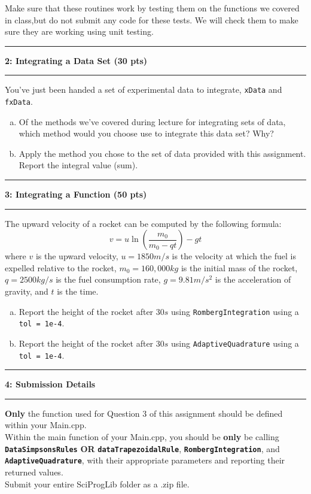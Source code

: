 \documentclass[11pt]{article}
\newcommand\question[2]{\vspace{.25in}\hrule\textbf{#1: #2}\vspace{.5em}\hrule\vspace{.10in}}
\begin{document}
Make sure that these routines work by testing them on the functions we covered in class,but do not submit any code for these tests. We will check them to make sure they are working using unit testing.
\newpage
\question{2}{Integrating a Data Set (30 pts)}
You've just been handed a set of experimental data to integrate, \texttt{xData} and \texttt{fxData}. 
\begin{enumerate}[(a)]
	\item Of the methods we've covered during lecture for integrating sets of data, which method would you choose use to integrate this data set? Why? \vspace{2cm}
	\item Apply the method you chose to the set of data provided with this assignment. Report the integral value (sum).
\end{enumerate}

\vspace{0.5cm}

\question{3}{Integrating a Function (50 pts)}
The upward velocity of a rocket can be computed by
the following formula:
$$v = u\ln\left(\frac{m_0}{m_0-qt}\right) -gt$$
where $v$ is the upward velocity, $u =1850 m/s$ is the velocity at which the fuel is expelled relative to the rocket, $m_0 = 160,000 kg$ is the initial mass of the rocket, $q = 2500 kg/s$ is the fuel consumption rate, $g = 9.81 m/s^2$ is the acceleration of gravity, and $t$ is the time. \\\vspace{5pt}

\begin{enumerate}[(a)]
	\item Report the height of the rocket after 30$s$ using \texttt{RombergIntegration} using a \texttt{tol = 1e-4}. \\\vspace{1cm}
	\item Report the height of the rocket after 30$s$ using \texttt{AdaptiveQuadrature} using a \texttt{tol = 1e-4}.
\end{enumerate}


\vspace{1cm}

 

\question{4}{Submission Details}
\textbf{Only} the function used for Question 3 of this assignment should be defined within your Main.cpp.\\\vspace{5pt}
Within the main function of your Main.cpp, you should be \textbf{only} be calling \textbf{\texttt{DataSimpsonsRules}} \textbf{OR} \textbf{\texttt{dataTrapezoidalRule}}, \textbf{\texttt{RombergIntegration}}, and \textbf{\texttt{AdaptiveQuadrature}}, with their appropriate parameters and reporting their returned values.\\\vspace{5pt}
Submit your entire SciProgLib folder as a .zip file.
\end{document}
